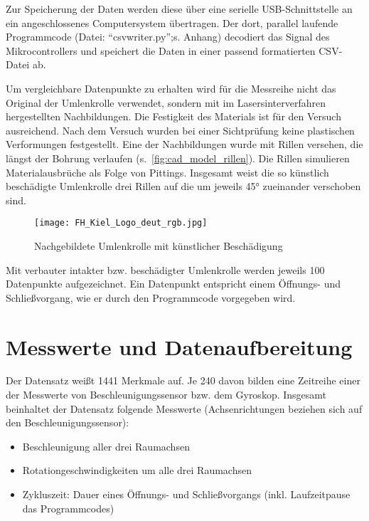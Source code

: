 Zur Speicherung der Daten werden diese über eine serielle USB-Schnittstelle an ein angeschlossenes Computersystem übertragen. Der dort, parallel laufende Programmcode (Datei: \enquote{csvwriter.py};s. Anhang) decodiert das Signal des Mikrocontrollers und speichert die Daten in einer passend formatierten CSV-Datei ab.

Um vergleichbare Datenpunkte zu erhalten wird für die Messreihe nicht das Original der Umlenkrolle verwendet, sondern mit im Lasersinterverfahren hergestellten Nachbildungen. Die Festigkeit des Materials ist für den Versuch ausreichend. Nach dem Versuch wurden bei einer Sichtprüfung keine plastischen Verformungen festgestellt. Eine der Nachbildungen wurde mit Rillen versehen, die längst der Bohrung verlaufen (s.~\cref{fig:cad_model_rillen}). Die Rillen simulieren Materialausbrüche als Folge von Pittings. Insgesamt weist die so künstlich beschädigte Umlenkrolle drei Rillen auf die um jeweils 45° zueinander verschoben sind.

\begin{figure}
	\centering
	\texttt{[image: FH\_Kiel\_Logo\_deut\_rgb.jpg]}
	\caption{Nachgebildete Umlenkrolle mit künstlicher Beschädigung}
	\label{fig:cad_model_umlenkrolle_rillen}
\end{figure}

Mit verbauter intakter bzw. beschädigter Umlenkrolle werden jeweils 100 Datenpunkte aufgezeichnet. Ein Datenpunkt entspricht einem Öffnungs- und Schließvorgang, wie er durch den Programmcode vorgegeben wird.
\section{Messwerte und Datenaufbereitung}
\label{sec:messdaten}
Der Datensatz weißt \num{1441} Merkmale auf. Je \num{240} davon bilden eine Zeitreihe einer der Messwerte von Beschleunigungssensor bzw. dem Gyroskop. Insgesamt beinhaltet der Datensatz folgende Messwerte (Achsenrichtungen beziehen sich auf den Beschleunigungssensor):
\begin{itemize}
	\item Beschleunigung aller drei Raumachsen
	\item Rotationgeschwindigkeiten um alle drei Raumachsen
	\item Zykluszeit: Dauer eines Öffnungs- und Schließvorgangs (inkl. Laufzeitpause das Programmcodes)
\end{itemize}

